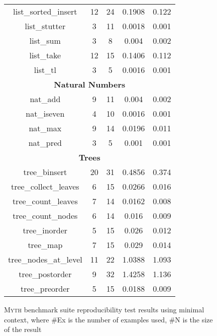 \documentclass[preprint, 11pt]{sigplanconf}
\begin{document}
\begin{figure}[!ht]
\begin{center}
\begin{tabular}{ccccc}
list\_sorted\_insert & 12 & 24 & 0.1908 & 0.122 \\
list\_stutter & 3 & 11 & 0.0018 & 0.001 \\
list\_sum & 3 & 8 & 0.004 & 0.002 \\
list\_take & 12 & 15 & 0.1406 & 0.112 \\
list\_tl & 3 & 5 & 0.0016 & 0.001 \\
  \hline
\multicolumn{5}{c}{\textbf{Natural Numbers}} \\
nat\_add & 9 & 11 & 0.004 & 0.002 \\
nat\_iseven & 4 & 10 & 0.0016 & 0.001 \\
nat\_max & 9 & 14 & 0.0196 & 0.011 \\
nat\_pred & 3 & 5 & 0.001 & 0.001 \\
  \hline
\multicolumn{5}{c}{\textbf{Trees}} \\
tree\_binsert & 20 & 31 & 0.4856 & 0.374 \\
tree\_collect\_leaves & 6 & 15 & 0.0266 & 0.016 \\
tree\_count\_leaves & 7 & 14 & 0.0162 & 0.008 \\
tree\_count\_nodes & 6 & 14 & 0.016 & 0.009 \\
tree\_inorder & 5 & 15 & 0.026 & 0.012 \\
tree\_map & 7 & 15 & 0.029 & 0.014 \\
tree\_nodes\_at\_level & 11 & 22 & 1.0388 & 1.093 \\
tree\_postorder & 9 & 32 & 1.4258 & 1.136 \\
tree\_preorder & 5 & 15 & 0.0188 & 0.009 \\
  \hline
  \end{tabular}
  \end{center}
  \caption{\textsc{Myth} benchmark suite reproducibility test results using minimal context, where \#Ex is the number of examples used, \#N is the size of the result}
  \label{fig-repr}
\end{figure}
\end{document}
